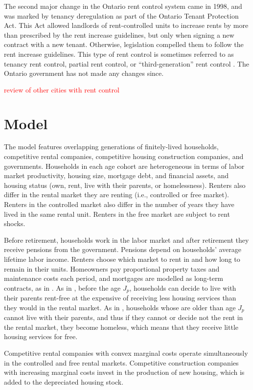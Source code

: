 \documentclass[parskip=full]{article}
\begin{document}
The second major change in the Ontario rent control system came in 1998, and was marked by tenancy deregulation as part of the Ontario Tenant Protection Act. This Act allowed landlords of rent-controlled units to increase rents by more than prescribed by the rent increase guidelines, but only when signing a new contract with a new tenant. Otherwise, legislation compelled them to follow the rent increase guidelines. This type of rent control is sometimes referred to as tenancy rent control, partial rent control, or “third-generation” rent control \citep{arnott-2003}. The Ontario government has not made any changes since. 

\textcolor{red}{review of other cities with rent control}

\section{Model}\label{sec:model}

The model features overlapping generations of finitely-lived households, competitive rental companies, competitive housing construction companies, and governments. Households in each age cohort are heterogeneous in terms of labor market productivity, housing size, mortgage debt, and financial assets, and housing status (own, rent, live with their parents, or homelessness). Renters also differ in the rental market they are renting (i.e., controlled or free market). Renters in the controlled market also differ in the number of years they have lived in the same rental unit. Renters in the free market are subject to rent shocks. 

Before retirement, households work in the labor market and after retirement they receive pensions from the government. Pensions depend on households' average lifetime labor income. Renters choose which market to rent in and how long to remain in their units. Homeowners pay proportional property taxes and maintenance costs each period, and mortgages are modelled as long-term contracts, as in \citet{rs-2023}. As in \citet{rs-2023}, before the age $J_{p}$, households can decide to live with their parents rent-free at the expensive of receiving less housing services than they would in the rental market. As in \citet{az-2024}, households whose are older than age $J_{p}$ cannot live with their parents, and thus if they cannot or decide not the rent in the rental market, they become homeless, which means that they receive little housing services for free. 

Competitive rental companies with convex marginal costs operate simultaneously in the controlled and free rental markets. Competitive construction companies with increasing marginal costs invest in the production of new housing, which is added to the depreciated housing stock. 
\end{document}
